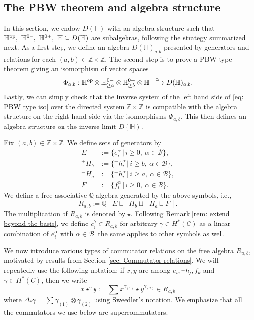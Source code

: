 \documentclass[10pt]{amsart}
\newcommand{\BZ}{\mathbb{Z}}
\newcommand{\BQ}{\mathbb{Q}}
\newcommand{\BH}{\mathbb{H}}
\newcommand{\CB}{\mathcal{B}}
\newcommand{\op}{\textnormal{op}}
\newcommand{\+}{{}^+}
\theoremstyle{definition}
\theoremstyle {definition}
\theoremstyle {definition}
\begin{document}
\subsection{The PBW theorem and algebra structure}

In this section, we endow $D(\BH)$ with an algebra structure such that $\BH^\op,\ \BH^{0-},\ \BH^{0+},\ \BH\subseteq D(\BH)$ are subalgebras, following the strategy summarized next. As a first step, we define an algebra $D(\BH)_{a,b}$ presented by generators and relations for each $(a,b)\in \BZ\times\BZ$. The second step is to prove a PBW type theorem giving an isomorphism of vector spaces
\begin{equation}\label{eq: PBW type iso}
    \Phi_{a,b}:\BH^{\op}\otimes \BH^{0-}_{\geq a}\otimes \BH^{0+}_{\geq b}\otimes \BH\xrightarrow{\ \simeq\ }D(\BH)_{a,b}. 
\end{equation}
Lastly, we can simply check that the inverse system of the left hand side of \eqref{eq: PBW type iso} over the directed system $\BZ\times\BZ$ is compatible with the algebra structure on the right hand side via the isomorphisms $\Phi_{a,b}$. This then defines an algebra structure on the inverse limit $D(\BH)$. 

Fix $(a,b)\in \BZ\times\BZ$. We define sets of generators by
\begin{align*}
    E&:=\{e^\alpha_i\,|\,i\geq 0,\ \alpha\in \CB\},\\
    {}^{+}H_b&:=\{{}^{+}h^\alpha_i\,|\,i\geq b,\ \alpha\in \CB\},\\
    {}^{-}H_a&:=\{{}^{-}h^\alpha_i\,|\,i\geq a,\ \alpha\in \CB\},\\
    F&:=\{f^\alpha_i\,|\,i\geq 0,\ \alpha\in \CB\}.
\end{align*}
We define a free associative $\BQ$-algebra generated by the above symbols, i.e., 
$$R_{a,b}:=\BQ[\,E\sqcup {}^{+}H_b\sqcup {}^{-}H_a\sqcup F\,]. 
$$
The multiplication of $R_{a,b}$ is denoted by $\star$. Following Remark \ref{rem: extend beyond the basis}, we define $e^\gamma_i\in R_{a,b}$ for arbitrary $\gamma\in H^*(C)$ as a linear combination of $e^\alpha_i$ with $\alpha\in \CB$; the same applies to other symbols as well. 


We now introduce various types of commutator relations on the free algebra $R_{a,b}$, motivated by results from Section \ref{sec: Commutator relations}. We will repeatedly use the following notation: if $x, y$ are among $e_i, {}^{\pm}h_j, f_k$ and $\gamma\in H^*(C)$, then we write
$$x\star^{\gamma}y:=\sum x^{\gamma_{(1)}}\star y^{\gamma_{(2)}}\in R_{a,b} 
$$
where $\Delta_*\gamma=\sum \gamma_{(1)}\otimes \gamma_{(2)}$ using Sweedler's notation. We emphasize that all the commutators we use below are supercommutators. 
\end{document}
